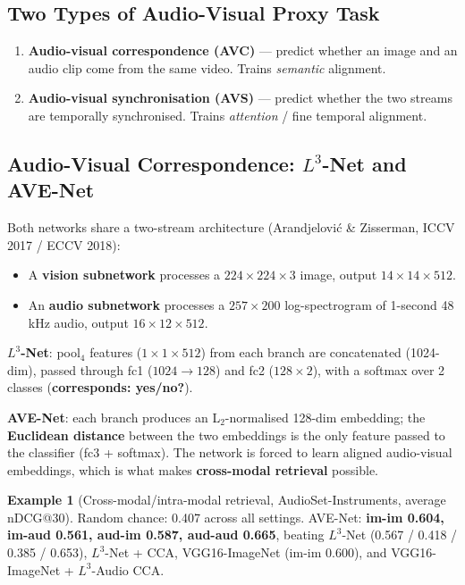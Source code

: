 \documentclass[11pt,a4paper]{article}
\theoremstyle{definition}
\newtheorem{example}{Example}[section]
\theoremstyle{plain}
\theoremstyle{remark}
\begin{document}
\subsection{Two Types of Audio-Visual Proxy Task}

\begin{enumerate}
    \item \textbf{Audio-visual correspondence (AVC)} --- predict whether an image and an audio clip come from the same video. Trains \emph{semantic} alignment.
    \item \textbf{Audio-visual synchronisation (AVS)} --- predict whether the two streams are temporally synchronised. Trains \emph{attention} / fine temporal alignment.
\end{enumerate}

\subsection{Audio-Visual Correspondence: $L^{3}$-Net and AVE-Net}

Both networks share a two-stream architecture (Arandjelović \& Zisserman, ICCV 2017 / ECCV 2018):

\begin{itemize}
    \item A \textbf{vision subnetwork} processes a $224\times 224\times 3$ image, output $14\times 14\times 512$.
    \item An \textbf{audio subnetwork} processes a $257\times 200$ log-spectrogram of 1-second 48 kHz audio, output $16\times 12\times 512$.
\end{itemize}

\textbf{$L^{3}$-Net}: pool$_4$ features ($1\times 1\times 512$) from each branch are concatenated (1024-dim), passed through fc1 ($1024 \to 128$) and fc2 ($128\times 2$), with a softmax over 2 classes (\textbf{corresponds: yes/no?}).

\textbf{AVE-Net}: each branch produces an L$_2$-normalised 128-dim embedding; the \textbf{Euclidean distance} between the two embeddings is the only feature passed to the classifier (fc3 + softmax). The network is forced to learn aligned audio-visual embeddings, which is what makes \textbf{cross-modal retrieval} possible.

\begin{example}[Cross-modal/intra-modal retrieval, AudioSet-Instruments, average nDCG@30]
Random chance: 0.407 across all settings. AVE-Net: \textbf{im-im 0.604, im-aud 0.561, aud-im 0.587, aud-aud 0.665}, beating $L^{3}$-Net (0.567 / 0.418 / 0.385 / 0.653), $L^{3}$-Net + CCA, VGG16-ImageNet (im-im 0.600), and VGG16-ImageNet + $L^{3}$-Audio CCA.
\end{example}
\end{document}
